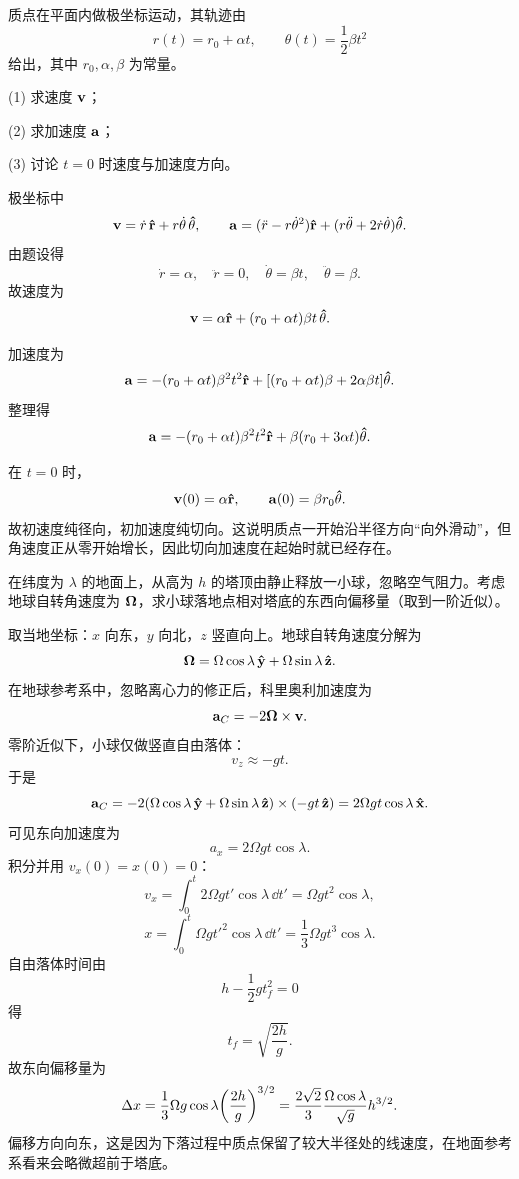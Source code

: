 \begin{university}
质点在平面内做极坐标运动，其轨迹由
\[
r(t)=r_0+\alpha t,
\qquad
\theta(t)=\frac12 \beta t^2
\]
给出，其中 $r_0,\alpha,\beta$ 为常量。

(1) 求速度 $\vb v$；

(2) 求加速度 $\vb a$；

(3) 讨论 $t=0$ 时速度与加速度方向。

\begin{solution}
极坐标中
\[
\vb v=\dot r\,\vu r+r\dot\theta\,\vu\theta,
\qquad
\vb a=(\ddot r-r\dot\theta^2)\vu r+(r\ddot\theta+2\dot r\dot\theta)\vu\theta.
\]
由题设得
\[
\dot r=\alpha,
\quad \ddot r=0,
\quad \dot\theta=\beta t,
\quad \ddot\theta=\beta.
\]
故速度为
\[
\vb v=\alpha\vu r+(r_0+\alpha t)\beta t\,\vu\theta.
\]

加速度为
\[
\vb a=-(r_0+\alpha t)\beta^2 t^2\vu r+\qty[(r_0+\alpha t)\beta+2\alpha\beta t]\vu\theta.
\]
整理得
\[
\vb a=-(r_0+\alpha t)\beta^2 t^2\vu r+\beta(r_0+3\alpha t)\vu\theta.
\]

在 $t=0$ 时，
\[
\vb v(0)=\alpha\vu r,
\qquad
\vb a(0)=\beta r_0\vu\theta.
\]
故初速度纯径向，初加速度纯切向。这说明质点一开始沿半径方向“向外滑动”，但角速度正从零开始增长，因此切向加速度在起始时就已经存在。
\end{solution}
\end{university}

\begin{university}
在纬度为 $\lambda$ 的地面上，从高为 $h$ 的塔顶由静止释放一小球，忽略空气阻力。考虑地球自转角速度为 $\vb\Omega$，求小球落地点相对塔底的东西向偏移量（取到一阶近似）。

\begin{solution}
取当地坐标：$x$ 向东，$y$ 向北，$z$ 竖直向上。地球自转角速度分解为
\[
\vb\Omega=\Omega\cos\lambda\,\vu y+\Omega\sin\lambda\,\vu z.
\]
在地球参考系中，忽略离心力的修正后，科里奥利加速度为
\[
\vb a_C=-2\vb\Omega\times \vb v.
\]
零阶近似下，小球仅做竖直自由落体：
\[
v_z\approx -gt.
\]
于是
\[
\vb a_C=-2\qty(\Omega\cos\lambda\,\vu y+\Omega\sin\lambda\,\vu z)\times (-gt\,\vu z)
=2\Omega g t\cos\lambda\,\vu x.
\]
可见东向加速度为
\[
a_x=2\Omega g t\cos\lambda.
\]
积分并用 $v_x(0)=x(0)=0$：
\[
v_x=\int_0^t 2\Omega g t'\cos\lambda\,\dd t'=
\Omega g t^2\cos\lambda,
\]
\[
x=\int_0^t \Omega g t'^2\cos\lambda\,\dd t'=
\frac13\Omega g t^3\cos\lambda.
\]
自由落体时间由
\[
h-\frac12 gt_f^2=0
\]
得
\[
t_f=\sqrt{\frac{2h}{g}}.
\]
故东向偏移量为
\[
\Delta x=\frac13\Omega g\cos\lambda\qty(\frac{2h}{g})^{3/2}
=\frac{2\sqrt2}{3}\frac{\Omega\cos\lambda}{\sqrt g}h^{3/2}.
\]
偏移方向向东，这是因为下落过程中质点保留了较大半径处的线速度，在地面参考系看来会略微超前于塔底。
\end{solution}
\end{university}

